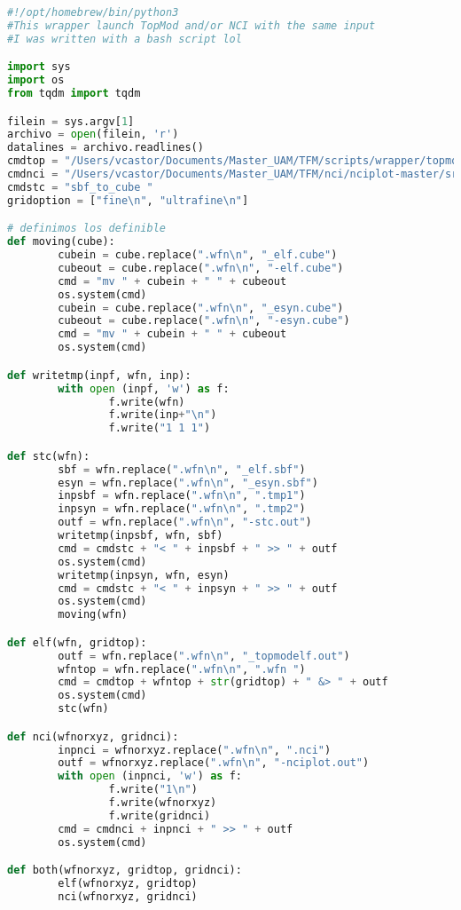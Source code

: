 \begin{lstlisting}[language=Python]
#!/opt/homebrew/bin/python3
#This wrapper launch TopMod and/or NCI with the same input
#I was written with a bash script lol

import sys
import os
from tqdm import tqdm

filein = sys.argv[1]
archivo = open(filein, 'r')
datalines = archivo.readlines()
cmdtop = "/Users/vcastor/Documents/Master_UAM/TFM/scripts/wrapper/topmod.exe "
cmdnci = "/Users/vcastor/Documents/Master_UAM/TFM/nci/nciplot-master/src_nciplot_4.0/nciplot "
cmdstc = "sbf_to_cube "
gridoption = ["fine\n", "ultrafine\n"]

# definimos los definible
def moving(cube):
        cubein = cube.replace(".wfn\n", "_elf.cube")
        cubeout = cube.replace(".wfn\n", "-elf.cube")
        cmd = "mv " + cubein + " " + cubeout
        os.system(cmd)
        cubein = cube.replace(".wfn\n", "_esyn.cube")
        cubeout = cube.replace(".wfn\n", "-esyn.cube")
        cmd = "mv " + cubein + " " + cubeout
        os.system(cmd)

def writetmp(inpf, wfn, inp):
        with open (inpf, 'w') as f:
                f.write(wfn)
                f.write(inp+"\n")
                f.write("1 1 1")

def stc(wfn):
        sbf = wfn.replace(".wfn\n", "_elf.sbf")
        esyn = wfn.replace(".wfn\n", "_esyn.sbf")
        inpsbf = wfn.replace(".wfn\n", ".tmp1")
        inpsyn = wfn.replace(".wfn\n", ".tmp2")
        outf = wfn.replace(".wfn\n", "-stc.out")
        writetmp(inpsbf, wfn, sbf)
        cmd = cmdstc + "< " + inpsbf + " >> " + outf
        os.system(cmd)
        writetmp(inpsyn, wfn, esyn)
        cmd = cmdstc + "< " + inpsyn + " >> " + outf
        os.system(cmd)
        moving(wfn)

def elf(wfn, gridtop):
        outf = wfn.replace(".wfn\n", "_topmodelf.out")
        wfntop = wfn.replace(".wfn\n", ".wfn ")
        cmd = cmdtop + wfntop + str(gridtop) + " &> " + outf
        os.system(cmd)
        stc(wfn)

def nci(wfnorxyz, gridnci):
        inpnci = wfnorxyz.replace(".wfn\n", ".nci")
        outf = wfnorxyz.replace(".wfn\n", "-nciplot.out")
        with open (inpnci, 'w') as f:
                f.write("1\n")
                f.write(wfnorxyz)
                f.write(gridnci)
        cmd = cmdnci + inpnci + " >> " + outf
        os.system(cmd)

def both(wfnorxyz, gridtop, gridnci):
        elf(wfnorxyz, gridtop)
        nci(wfnorxyz, gridnci)


\end{lstlisting}
